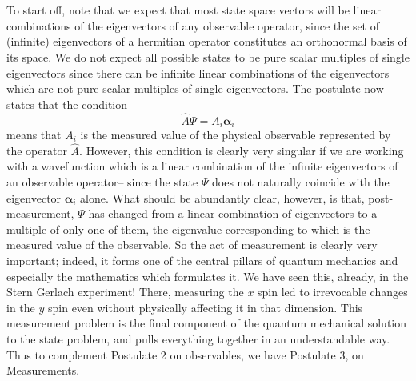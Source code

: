 \\\\
To start off, note that we expect that most state space vectors will be linear combinations of the eigenvectors of any observable operator, since the set of (infinite) eigenvectors of a hermitian operator constitutes an orthonormal basis of its space. We do not expect all possible states to be pure scalar multiples of single eigenvectors since there can be infinite linear combinations of the eigenvectors which are not pure scalar multiples of single eigenvectors. 
The postulate now states that the condition
\[
\hat{A}\Psi=A_{i}\bm{\alpha}_{i}\]
means that $A_{i}$ is the measured value of the physical observable represented by the operator $\hat{A}$. However, this condition is clearly very singular if we are working with a wavefunction which is a linear combination of the infinite eigenvectors of an observable operator-- since the state $\Psi$ does not naturally coincide with the eigenvector $\bm{\alpha}_{i}$ alone. What should be abundantly clear, however, is that, post-measurement, $\Psi$ has changed from a linear combination of eigenvectors to a multiple of only one of them, the eigenvalue corresponding to which is the measured value of the observable. So the act of measurement is clearly very important; indeed, it forms one of the central pillars of quantum mechanics and especially the mathematics which formulates it. We have seen this, already, in the Stern Gerlach experiment! There, measuring the $x$ spin led to irrevocable changes in the $y$ spin even without physically affecting it in that dimension. This measurement problem is the final component of the quantum mechanical solution to the state problem, and pulls everything together in an understandable way. Thus to complement Postulate 2 on observables, we have Postulate 3, on Measurements.
